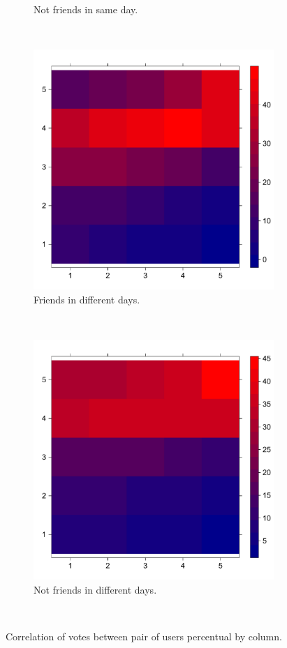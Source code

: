 \documentclass[12pt]{article}
\begin{document}
\begin{figure}[H]
\begin{subfigure}[b]{0.5\textwidth}
    \caption{Not friends in same day.}\label{fig:nfri_eq}
  \end{subfigure}
  ~
  \begin{subfigure}[b]{0.5\textwidth}
    \captionsetup{font=small}
    \includegraphics[width=\textwidth]{img/amig_dif_n}
    \caption{Friends in different days.}\label{fig:fri_dif}
  \end{subfigure}%
  ~
  \begin{subfigure}[b]{0.5\textwidth}
    \captionsetup{font=small}
    \includegraphics[width=\textwidth]{img/namig_dif_n}
    \caption{Not friends in different days.}\label{fig:nfri_dif}
  \end{subfigure}
  ~
  \caption{Correlation of votes between pair of users percentual by column.}
  \label{fig:rat_heat}
\end{figure}
\end{document}
